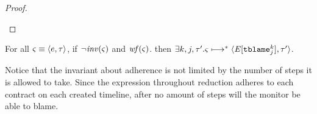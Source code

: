 {{\begin{proof}
\begin{byCases}
    \end{byCases}
  \end{proof}}
%
\begin{theorem}
  For all $\mstate\equiv\chevron{\mexp,\mTMons}$,
  if $\neg\inv(\mstate)$ and $\wf(\mstate)$. then $\exists k,j, \mTMons'. \mstate \machstep^* \chevron{\mctx{\mmlab^\prime}[\stblame{k}{j}], \mTMons'}$.
\end{theorem}
%
Notice that the invariant about adherence is not limited by the number of steps it is allowed to take.
%
Since the expression throughout reduction adheres to each contract on each created timeline, after no amount of steps will the monitor be able to blame.
}